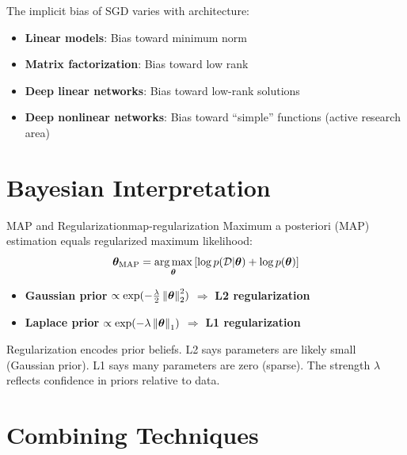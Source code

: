 \documentclass[../../main.tex]{subfiles}
\begin{document}
\begin{keyconcept}
The implicit bias of SGD varies with architecture:
\begin{itemize}
    \item \textbf{Linear models}: Bias toward minimum norm
    \item \textbf{Matrix factorization}: Bias toward low rank
    \item \textbf{Deep linear networks}: Bias toward low-rank solutions
    \item \textbf{Deep nonlinear networks}: Bias toward ``simple'' functions (active research area)
\end{itemize}
\end{keyconcept}

\section{Bayesian Interpretation}
\label{sec:bayesian-regularization}

\begin{theorem}{MAP and Regularization}{map-regularization}
Maximum a posteriori (MAP) estimation equals regularized maximum likelihood:
\[
    \boldsymbol{\theta}_{\text{MAP}} = \operatorname*{arg\,max}_{\boldsymbol{\theta}} \left[\log p(\mathcal{D}|\boldsymbol{\theta}) + \log p(\boldsymbol{\theta})\right]
\]
\begin{itemize}
    \item \textbf{Gaussian prior} $\propto \exp(-\frac{\lambda}{2}\left\lVert \boldsymbol{\theta} \right\rVert_2^2)$ $\Rightarrow$ \textbf{L2 regularization}
    \item \textbf{Laplace prior} $\propto \exp(-\lambda\left\lVert \boldsymbol{\theta} \right\rVert_1)$ $\Rightarrow$ \textbf{L1 regularization}
\end{itemize}
\end{theorem}

\begin{intuition}
Regularization encodes prior beliefs. L2 says parameters are likely small (Gaussian prior). L1 says many parameters are zero (sparse). The strength $\lambda$ reflects confidence in priors relative to data.
\end{intuition}

\section{Combining Techniques}
\label{sec:combining-regularization}
\end{document}
